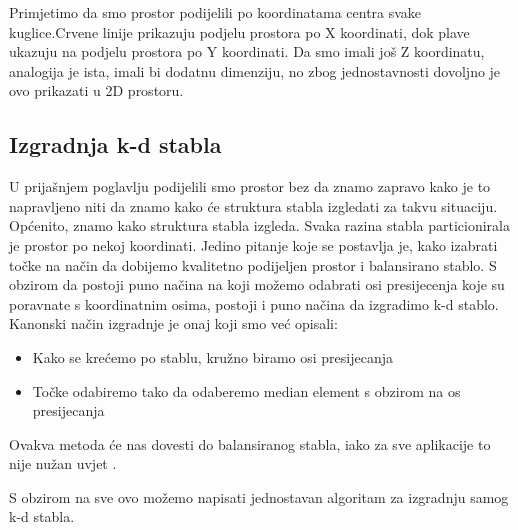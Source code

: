 Primjetimo da smo prostor podijelili po koordinatama centra svake kuglice.Crvene linije prikazuju podjelu prostora po X koordinati, dok plave ukazuju na podjelu prostora po Y koordinati. Da smo imali još Z koordinatu, analogija je ista, imali bi dodatnu dimenziju, no zbog jednostavnosti dovoljno je ovo prikazati u 2D prostoru.\newpage

\subsection{Izgradnja k-d stabla}
U prijašnjem poglavlju podijelili smo prostor bez da znamo zapravo kako je to napravljeno niti da znamo kako će struktura stabla izgledati za takvu situaciju. Općenito, znamo kako struktura stabla izgleda. Svaka razina stabla particionirala je prostor po nekoj koordinati. Jedino pitanje koje se postavlja je, kako izabrati točke na način da dobijemo kvalitetno podijeljen prostor i balansirano stablo. S obzirom da postoji puno načina na koji možemo odabrati osi presijecenja koje su poravnate s koordinatnim osima, postoji i puno načina da izgradimo k-d stablo. Kanonski način izgradnje je onaj koji smo već opisali\cite{14}:
\begin{itemize}
	\item Kako se krećemo po stablu, kružno biramo osi presijecanja
	\item Točke odabiremo tako da odaberemo median element s obzirom na os presijecanja
\end{itemize}
Ovakva metoda će nas dovesti do balansiranog stabla, iako za sve aplikacije to nije nužan uvjet \cite{14}.

S obzirom na sve ovo možemo napisati jednostavan algoritam za izgradnju samog k-d stabla.

